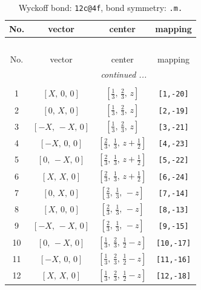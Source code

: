 \documentclass[fleqn,8pt]{jsarticle}
\begin{document}
\renewcommand{\arraystretch}{1.2}
\begin{longtable}{cccc}
\caption{Wyckoff bond: {\tt 12c@4f}, bond symmetry: {\tt .m.}}
 \\
 \hline \hline
No. & vector & center & mapping \\ \hline \endfirsthead

\multicolumn{3}{l}{\tablename\ \thetable{}} \\
 \hline \hline
No. & vector & center & mapping \\ \hline \endhead

 \hline \hline
\multicolumn{3}{r}{\footnotesize\it continued ...} \\ \endfoot

 \hline \hline
\multicolumn{3}{r}{} \\ \endlastfoot

1 & $\left[ X,\, 0,\, 0 \right]$ & $\left[ \frac{1}{3},\, \frac{2}{3},\, z \right]$ & {\tt [1,-20]} \\ \hline
2 & $\left[ 0,\, X,\, 0 \right]$ & $\left[ \frac{1}{3},\, \frac{2}{3},\, z \right]$ & {\tt [2,-19]} \\ \hline
3 & $\left[ - X,\, - X,\, 0 \right]$ & $\left[ \frac{1}{3},\, \frac{2}{3},\, z \right]$ & {\tt [3,-21]} \\ \hline
4 & $\left[ - X,\, 0,\, 0 \right]$ & $\left[ \frac{2}{3},\, \frac{1}{3},\, z + \frac{1}{2} \right]$ & {\tt [4,-23]} \\ \hline
5 & $\left[ 0,\, - X,\, 0 \right]$ & $\left[ \frac{2}{3},\, \frac{1}{3},\, z + \frac{1}{2} \right]$ & {\tt [5,-22]} \\ \hline
6 & $\left[ X,\, X,\, 0 \right]$ & $\left[ \frac{2}{3},\, \frac{1}{3},\, z + \frac{1}{2} \right]$ & {\tt [6,-24]} \\ \hline
7 & $\left[ 0,\, X,\, 0 \right]$ & $\left[ \frac{2}{3},\, \frac{1}{3},\, - z \right]$ & {\tt [7,-14]} \\ \hline
8 & $\left[ X,\, 0,\, 0 \right]$ & $\left[ \frac{2}{3},\, \frac{1}{3},\, - z \right]$ & {\tt [8,-13]} \\ \hline
9 & $\left[ - X,\, - X,\, 0 \right]$ & $\left[ \frac{2}{3},\, \frac{1}{3},\, - z \right]$ & {\tt [9,-15]} \\ \hline
10 & $\left[ 0,\, - X,\, 0 \right]$ & $\left[ \frac{1}{3},\, \frac{2}{3},\, \frac{1}{2} - z \right]$ & {\tt [10,-17]} \\ \hline
11 & $\left[ - X,\, 0,\, 0 \right]$ & $\left[ \frac{1}{3},\, \frac{2}{3},\, \frac{1}{2} - z \right]$ & {\tt [11,-16]} \\ \hline
12 & $\left[ X,\, X,\, 0 \right]$ & $\left[ \frac{1}{3},\, \frac{2}{3},\, \frac{1}{2} - z \right]$ & {\tt [12,-18]} \\
\end{longtable}
\end{document}
